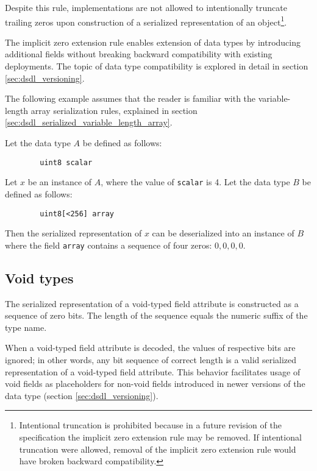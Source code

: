 Despite this rule, implementations are not allowed to intentionally truncate trailing zeros
upon construction of a serialized representation of an object\footnote{%
    Intentional truncation is prohibited because in a future revision of the specification the implicit zero
    extension rule may be removed.
    If intentional truncation were allowed, removal of the implicit zero extension rule would have
    broken backward compatibility.
}.

\begin{remark}
    The implicit zero extension rule enables extension of data types by introducing additional fields
    without breaking backward compatibility with existing deployments.
    The topic of data type compatibility is explored in detail in section \ref{sec:dsdl_versioning}.

    The following example assumes that the reader is familiar with the variable-length array serialization rules,
    explained in section \ref{sec:dsdl_serialized_variable_length_array}.

    Let the data type $A$ be defined as follows:

    \begin{verbatim}
        uint8 scalar
    \end{verbatim}

    Let $x$ be an instance of $A$, where the value of \verb|scalar| is 4.
    Let the data type $B$ be defined as follows:

    \begin{verbatim}
        uint8[<256] array
    \end{verbatim}

    Then the serialized representation of $x$ can be deserialized into an instance of $B$ where the field
    \verb|array| contains a sequence of four zeros: $0, 0, 0, 0$.
\end{remark}

\subsection{Void types}\label{sec:dsdl_serialized_void}

The serialized representation of a void-typed field attribute is constructed as a sequence of zero bits.
The length of the sequence equals the numeric suffix of the type name.

When a void-typed field attribute is decoded, the values of respective bits are ignored;
in other words, any bit sequence of correct length is a valid serialized representation
of a void-typed field attribute.
This behavior facilitates usage of void fields as placeholders for non-void fields
introduced in newer versions of the data type (section \ref{sec:dsdl_versioning}).


